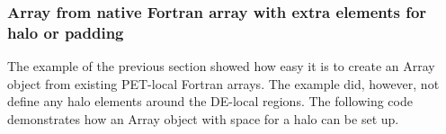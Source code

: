  
\setlength{\oldparskip}{\parskip}
\setlength{\parskip}{1.5ex}
\setlength{\oldparindent}{\parindent}
\setlength{\parindent}{0pt}
\setlength{\oldbaselineskip}{\baselineskip}
\setlength{\baselineskip}{11pt}
 
\def\bv{\begin{verbatim}}
\def\ev{\end{verbatim}}
\def\be{\begin{equation}}
\def\ee{\end{equation}}
\def\bea{\begin{eqnarray}}
\def\eea{\end{eqnarray}}
\def\bi{\begin{itemize}}
\def\ei{\end{itemize}}
\def\bn{\begin{enumerate}}
\def\en{\end{enumerate}}
\def\bd{\begin{description}}
\def\ed{\end{description}}
\def\({\left (}
\def\){\right )}
\def\[{\left [}
\def\]{\right ]}
\def\<{\left  \langle}
\def\>{\right \rangle}
\def\cI{{\cal I}}
\def\diag{\mathop{\rm diag}}
\def\tr{\mathop{\rm tr}}


 

   \subsubsection{Array from native Fortran array with extra elements for halo or padding}
   \label{Array:fpadding}
  
   The example of the previous section showed how easy it is to create an Array
   object from existing PET-local Fortran arrays. The example did, however, not
   define any halo elements around the DE-local regions. The following code
   demonstrates how an Array object with space for a halo can be set up. 

